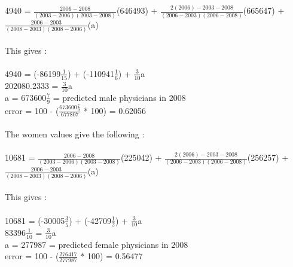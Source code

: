 \documentclass{article}
\begin{document}
	4940 = $\frac{2006 - 2008}{(2003-2006)(2003-2008)}$(646493)
	+
	$\frac{2(2006) - 2003 - 2008}{(2006-2003)(2006-2008)}$(665647)
	+
	$\frac{2006 - 2003}{(2008-2003)(2008-2006)}$(a)\\\\

	This gives :\\\\
	4940 = (-86199$\frac{1}{15}$) + (-110941$\frac{1}{6}$) + $\frac{3}{10}$a\\
	202080.2333 = $\frac{3}{10}$a\\
	a = 673600$\frac{7}{9}$ = predicted male physicians in 2008\\
	error = 100 - ($\frac{673600\frac{7}{9}}{677807}$ * 100) = 0.62056\\\\
	
	
	The women values give the following :\\\\
	
	10681 = $\frac{2006 - 2008}{(2003-2006)(2003-2008)}$(225042)
	+
	$\frac{2(2006) - 2003 - 2008}{(2006-2003)(2006-2008)}$(256257)
	+
	$\frac{2006 - 2003}{(2008-2003)(2008-2006)}$(a)\\\\
	
	This gives :\\\\
	10681 = (-30005$\frac{3}{5}$) + (-42709$\frac{1}{2}$) + $\frac{3}{10}$a\\
	83396$\frac{1}{10}$ = $\frac{3}{10}$a\\
	a = 277987 = predicted female physicians in 2008\\
	error = 100 - ($\frac{276417}{277987}$ * 100) = 0.56477\\\\
	
	
	
	
	
	
	
	
				
\end{document}
